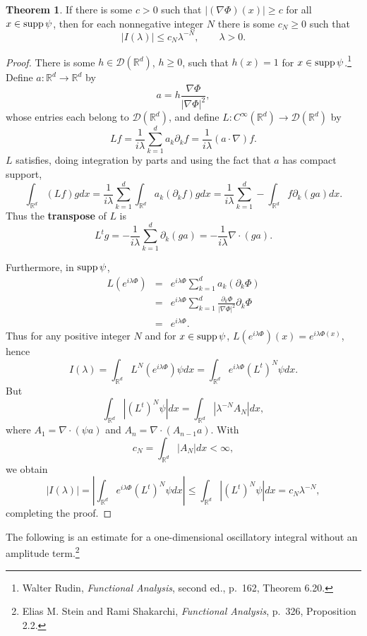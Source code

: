 \documentclass{article}
\newcommand{\supp}{\ensuremath\mathrm{supp}\,}
\theoremstyle{definition}
\newtheorem{theorem}{Theorem}
\theoremstyle{definition}
\begin{document}
\begin{theorem}
If there is some $c>0$ such that $|(\nabla \Phi)(x)| \geq c$ for all $x \in \supp \psi$, then for each nonnegative integer $N$ there is some
$c_N \geq 0$ such that
\[
|I(\lambda)| \leq c_N \lambda^{-N}, \qquad \lambda>0.
\]
\end{theorem}
\begin{proof}
There is some $h \in \mathscr{D}(\mathbb{R}^d)$, $h \geq 0$, such that $h(x)=1$ for $x \in \supp \psi$.\footnote{Walter Rudin, {\em Functional Analysis},
second ed., p.~162, Theorem 6.20.}
Define $a:\mathbb{R}^d \to \mathbb{R}^d$ by
\[
a = h \frac{\nabla \Phi}{|\nabla \Phi|^2},
\]
whose entries each belong to $\mathscr{D}(\mathbb{R}^d)$,
and define $L: C^\infty(\mathbb{R}^d) \to \mathscr{D}(\mathbb{R}^d)$ by
\[ 
Lf = \frac{1}{i\lambda} \sum_{k=1}^d a_k \partial_k f = \frac{1}{i\lambda} (a\cdot \nabla) f.
\]
$L$ satisfies, doing integration by parts and using the fact that $a$ has compact support,
\[
\int_{\mathbb{R}^d} (Lf)g dx = \frac{1}{i\lambda}  \sum_{k=1}^d \int_{\mathbb{R}^d} a_k (\partial_k f) g dx
=\frac{1}{i\lambda}  \sum_{k=1}^d -\int_{\mathbb{R}^d} f \partial_k(ga) dx.
\]
Thus the \textbf{transpose} of $L$ is
\[
L^t g = -\frac{1}{i\lambda} \sum_{k=1}^d \partial_k(ga) = -\frac{1}{i\lambda} \nabla \cdot (ga).
\]

Furthermore,  in $\supp \psi$,
\begin{eqnarray*}
L(e^{i\lambda \Phi}) &=& e^{i\lambda \Phi} \sum_{k=1}^d a_k (\partial_k \Phi)  \\
&=&  e^{i\lambda \Phi} \sum_{k=1}^d \frac{\partial_k \Phi}{|\nabla \Phi|^2} \partial_k \Phi\\
&=& e^{i\lambda \Phi}.
\end{eqnarray*}
Thus   for any positive integer $N$ and for $x \in \supp \psi$, $L(e^{i\lambda \Phi})(x) = e^{i\lambda \Phi(x)}$, hence
\[
I(\lambda) = \int_{\mathbb{R}^d} L^N(e^{i\lambda \Phi}) \psi dx = \int_{\mathbb{R}^d} e^{i\lambda \Phi} (L^t)^N \psi dx.
\]
But
\[
\int_{\mathbb{R}^d} |(L^t)^N \psi| dx = \int_{\mathbb{R}^d} | \lambda^{-N} A_N| dx,
\]
where  $A_1 = \nabla \cdot (\psi a)$ and $A_n=\nabla \cdot (A_{n-1} a)$. With
\[
c_N = \int_{\mathbb{R}^d} |A_N| dx < \infty,
\]
we obtain
\[
|I(\lambda)|
=\left|  \int_{\mathbb{R}^d} e^{i\lambda \Phi} (L^t)^N \psi dx \right|
 \leq \int_{\mathbb{R}^d} |(L^t)^N \psi| dx = c_N \lambda^{-N},
\]
completing the proof.
\end{proof}

The following is an estimate for a one-dimensional oscillatory integral without an amplitude term.\footnote{Elias
M. Stein and Rami Shakarchi, {\em Functional Analysis}, p.~326, Proposition 2.2.}
\end{document}
